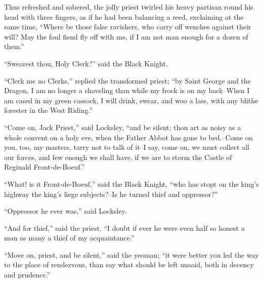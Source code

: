 Thus refreshed and sobered, the jolly priest twirled his heavy partisan
round his head with three fingers, as if he had been balancing a reed,
exclaiming at the same time, ``Where be those false ravishers, who carry
off wenches against their will? May the foul fiend fly off with me, if I
am not man enough for a dozen of them.''

``Swearest thou, Holy Clerk?'' said the Black Knight.

``Clerk me no Clerks,'' replied the transformed priest; ``by Saint
George and the Dragon, I am no longer a shaveling than while my frock is
on my back--When I am cased in my green cassock, I will drink, swear,
and woo a lass, with any blithe forester in the West Riding.''

``Come on, Jack Priest,'' said Locksley, ``and be silent; thou art as
noisy as a whole convent on a holy eve, when the Father Abbot has gone
to bed.--Come on you, too, my masters, tarry not to talk of it--I say,
come on, we must collect all our forces, and few enough we shall have,
if we are to storm the Castle of Reginald Front-de-Boeuf.''

``What! is it Front-de-Boeuf,'' said the Black Knight, ``who has stopt
on the king's highway the king's liege subjects?--Is he turned thief and
oppressor?''

``Oppressor he ever was,'' said Locksley.

``And for thief,'' said the priest, ``I doubt if ever he were even half
so honest a man as many a thief of my acquaintance.''

``Move on, priest, and be silent,'' said the yeoman; ``it were better
you led the way to the place of rendezvous, than say what should be left
unsaid, both in decency and prudence.''
